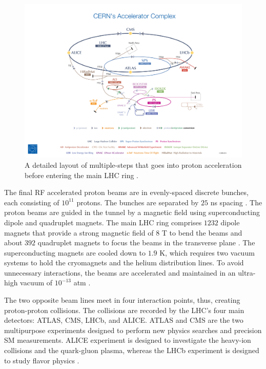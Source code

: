 \begin{figure}[!htb]
    \centering
    \includegraphics[width=.98\linewidth]{figures/LHC/ProtonAccelerator.jpeg}
    \caption{ A detailed layout of multiple-steps that goes into proton acceleration before entering the main LHC ring \cite{ProtonAcclerator}.\label{fig:ProtonAcc}}
\end{figure}

The final RF accelerated proton beams are in evenly-spaced discrete bunches, each consisting of $10^{11}$ protons. The bunches are separated by $25$ ns spacing \cite{LHCGuide}. The proton beams are guided in the tunnel by a magnetic field using superconducting dipole and quadruplet magnets. The main LHC ring comprises $1232$ dipole magnets that provide a strong magnetic field of $8$ T to bend the beams and about $392$ quadruplet magnets to focus the beams in the transverse plane \cite{LHCGuide}. The superconducting magnets are cooled down to $1.9$ K, which requires two vacuum systems to hold the cryomagnets and the helium distribution lines. To avoid unnecessary interactions, the beams are accelerated and maintained in an ultra-high vacuum of $10^{-13}$ atm \cite{LHCGuide}. 

The two opposite beam lines meet in four interaction points, thus, creating proton-proton collisions. The collisions are recorded by the LHC's four main detectors: ATLAS, CMS, LHCb, and ALICE. ATLAS and CMS are the two multipurpose experiments designed to perform new physics searches and precision SM measurements. ALICE experiment is designed to investigate the heavy-ion collisions and the quark-gluon plasma, whereas the LHCb experiment is designed to study flavor physics \cite{LHCGuide}.